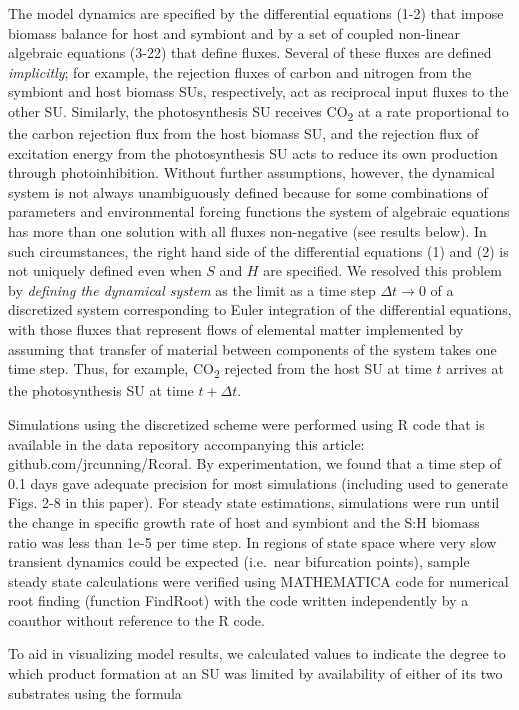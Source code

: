 \documentclass[]{elsarticle} %
\begin{document}
The model dynamics are specified by the differential equations (1-2)
that impose biomass balance for host and symbiont and by a set of
coupled non-linear algebraic equations (3-22) that define fluxes.
Several of these fluxes are defined \emph{implicitly}; for example, the
rejection fluxes of carbon and nitrogen from the symbiont and host
biomass SUs, respectively, act as reciprocal input fluxes to the other
SU. Similarly, the photosynthesis SU receives CO\textsubscript{2} at a
rate proportional to the carbon rejection flux from the host biomass SU,
and the rejection flux of excitation energy from the photosynthesis SU
acts to reduce its own production through photoinhibition. Without
further assumptions, however, the dynamical system is not always
unambiguously defined because for some combinations of parameters and
environmental forcing functions the system of algebraic equations has
more than one solution with all fluxes non-negative (see results below).
In such circumstances, the right hand side of the differential equations
(1) and (2) is not uniquely defined even when \(S\) and \(H\) are
specified. We resolved this problem by \emph{defining the dynamical
system} as the limit as a time step \(\Delta t \rightarrow 0\) of a
discretized system corresponding to Euler integration of the
differential equations, with those fluxes that represent flows of
elemental matter implemented by assuming that transfer of material
between components of the system takes one time step. Thus, for example,
CO\textsubscript{2} rejected from the host SU at time \(t\) arrives at
the photosynthesis SU at time \(t + \Delta t\).

Simulations using the discretized scheme were performed using R code
that is available in the data repository accompanying this article:
github.com/jrcunning/Rcoral. By experimentation, we found that a time
step of 0.1 days gave adequate precision for most simulations (including
used to generate Figs. 2-8 in this paper). For steady state estimations,
simulations were run until the change in specific growth rate of host
and symbiont and the S:H biomass ratio was less than 1e-5 per time step.
In regions of state space where very slow transient dynamics could be
expected (i.e.~near bifurcation points), sample steady state
calculations were verified using MATHEMATICA code for numerical root
finding (function FindRoot) with the code written independently by a
coauthor without reference to the R code.

To aid in visualizing model results, we calculated values to indicate
the degree to which product formation at an SU was limited by
availability of either of its two substrates using the formula
\end{document}
